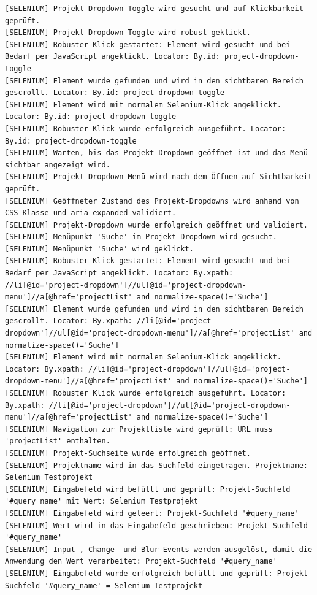 \begin{lstlisting}[caption={Selenium -- Kontrolllauf Activity bearbeiten (Erfolgreich)}, label={lst:sel_ctrl_act_ok}, style=logStyle]
[SELENIUM] Projekt-Dropdown-Toggle wird gesucht und auf Klickbarkeit geprüft.
[SELENIUM] Projekt-Dropdown-Toggle wird robust geklickt.
[SELENIUM] Robuster Klick gestartet: Element wird gesucht und bei Bedarf per JavaScript angeklickt. Locator: By.id: project-dropdown-toggle
[SELENIUM] Element wurde gefunden und wird in den sichtbaren Bereich gescrollt. Locator: By.id: project-dropdown-toggle
[SELENIUM] Element wird mit normalem Selenium-Klick angeklickt. Locator: By.id: project-dropdown-toggle
[SELENIUM] Robuster Klick wurde erfolgreich ausgeführt. Locator: By.id: project-dropdown-toggle
[SELENIUM] Warten, bis das Projekt-Dropdown geöffnet ist und das Menü sichtbar angezeigt wird.
[SELENIUM] Projekt-Dropdown-Menü wird nach dem Öffnen auf Sichtbarkeit geprüft.
[SELENIUM] Geöffneter Zustand des Projekt-Dropdowns wird anhand von CSS-Klasse und aria-expanded validiert.
[SELENIUM] Projekt-Dropdown wurde erfolgreich geöffnet und validiert.
[SELENIUM] Menüpunkt 'Suche' im Projekt-Dropdown wird gesucht.
[SELENIUM] Menüpunkt 'Suche' wird geklickt.
[SELENIUM] Robuster Klick gestartet: Element wird gesucht und bei Bedarf per JavaScript angeklickt. Locator: By.xpath: //li[@id='project-dropdown']//ul[@id='project-dropdown-menu']//a[@href='projectList' and normalize-space()='Suche']
[SELENIUM] Element wurde gefunden und wird in den sichtbaren Bereich gescrollt. Locator: By.xpath: //li[@id='project-dropdown']//ul[@id='project-dropdown-menu']//a[@href='projectList' and normalize-space()='Suche']
[SELENIUM] Element wird mit normalem Selenium-Klick angeklickt. Locator: By.xpath: //li[@id='project-dropdown']//ul[@id='project-dropdown-menu']//a[@href='projectList' and normalize-space()='Suche']
[SELENIUM] Robuster Klick wurde erfolgreich ausgeführt. Locator: By.xpath: //li[@id='project-dropdown']//ul[@id='project-dropdown-menu']//a[@href='projectList' and normalize-space()='Suche']
[SELENIUM] Navigation zur Projektliste wird geprüft: URL muss 'projectList' enthalten.
[SELENIUM] Projekt-Suchseite wurde erfolgreich geöffnet.
[SELENIUM] Projektname wird in das Suchfeld eingetragen. Projektname: Selenium Testprojekt
[SELENIUM] Eingabefeld wird befüllt und geprüft: Projekt-Suchfeld '#query_name' mit Wert: Selenium Testprojekt
[SELENIUM] Eingabefeld wird geleert: Projekt-Suchfeld '#query_name'
[SELENIUM] Wert wird in das Eingabefeld geschrieben: Projekt-Suchfeld '#query_name'
[SELENIUM] Input-, Change- und Blur-Events werden ausgelöst, damit die Anwendung den Wert verarbeitet: Projekt-Suchfeld '#query_name'
[SELENIUM] Eingabefeld wurde erfolgreich befüllt und geprüft: Projekt-Suchfeld '#query_name' = Selenium Testprojekt

\end{lstlisting}
